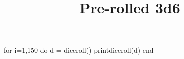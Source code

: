 \documentclass[a4paper]{article}
\begin{document}
\title{Pre-rolled 3d6}
\maketitle
\begin{multicols}{5}
\Large\noindent\centering
  \begin{luacode}
    for i=1,150 do
    d = diceroll()
    printdiceroll(d)
    end
  \end{luacode}
\end{multicols}
\end{document}
